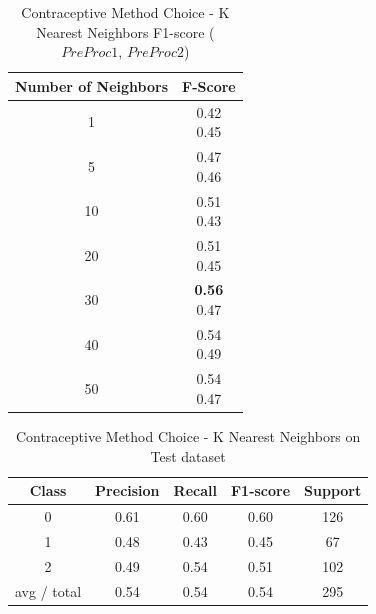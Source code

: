 \begin{table}[p]
\begin{center}
\begin{tabular}{|c|c|}
\hline Number of Neighbors & F-Score \\

\hline 1 & \minibox{0.42\\ 0.45} \\
\hline 5 & \minibox{0.47\\ 0.46} \\
\hline 10 & \minibox{0.51\\ 0.43} \\
\hline 20 & \minibox{0.51\\ 0.45} \\
\hline 30 & \minibox{\textbf{0.56}\\ 0.47} \\
\hline 40 & \minibox{0.54\\ 0.49} \\
\hline 50 & \minibox{0.54\\ 0.47} \\

\hline
\end{tabular}

\caption{Contraceptive Method Choice - K Nearest Neighbors  F1-score ($PreProc1$, $PreProc2$)}
\label{ds1:table:knn}
\end{center}
\end{table}


\begin{table}[p]
\begin{center}
\begin{tabular}{|c|c|c|c|c|}
\hline Class & Precision & Recall & F1-score & Support \\

\hline 0 & 0.61 & 0.60 & 0.60 & 126\\
\hline 1 & 0.48 & 0.43 & 0.45 & 67\\
\hline 2 & 0.49 & 0.54 & 0.51 & 102\\
\hline avg / total & 0.54 & 0.54 & 0.54 & 295\\
\hline
\end{tabular}

\caption{Contraceptive Method Choice - K Nearest Neighbors on Test dataset}
\label{ds1:table:knn-test}
\end{center}
\end{table}


